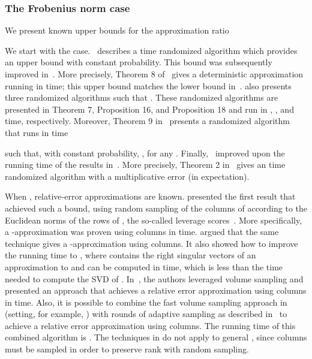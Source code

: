 \subsubsection{The Frobenius norm case}

We present known upper bounds for the approximation ratio

We start with the  case.~\cite{BMD09a} describes a 
time randomized algorithm which provides an upper bound  with constant probability.
This bound was subsequently improved in~\cite{DR10}. More precisely,
Theorem 8 of~\cite{DR10} gives a  deterministic approximation
running in  time;
this upper bound matches the lower
bound in~\cite{DRVW06}.
\cite{DR10} also presents three randomized algorithms such that .
These randomized algorithms are presented in Theorem 7, Proposition 16, and Proposition 18 and run in
, , and  time, respectively.
Moreover, Theorem 9 in~\cite{DR10} presents a randomized algorithm that runs in time 

such that, with constant probability, 
,
for any . Finally,~\cite{GS2011} improved upon the running time of the results in~\cite{DR10}.
More precisely, Theorem 2 in~\cite{GS2011} gives an  time randomized algorithm with
a  multiplicative error (in expectation).

When , relative-error approximations are known.
\cite{DMM06b} presented the first result that achieved such a bound, using random sampling of the columns of  according to the Euclidean norms of the rows of , the so-called leverage scores~\cite{MD09}. More specifically, a -approximation was proven using  columns in  time. \cite{Sar06} argued
that the same technique gives a -approximation
using  columns. It also  showed how to improve the running time to , where  contains the right singular vectors of an approximation to  and can be computed in
 time, which is less than the time needed to compute the SVD of .
In~\cite{DV06}, the authors leveraged volume sampling and presented an approach that achieves a relative error approximation using  columns in  time. Also, it is possible to combine the fast volume sampling approach in~\cite{DR10} (setting, for example, ) with  rounds of adaptive sampling as described in~\cite{DV06} to achieve a relative error approximation using  columns. The running time of this combined algorithm is .
The techniques in \cite{DMM06b} do not apply to general , since  columns must be sampled in order to preserve rank with random sampling.

